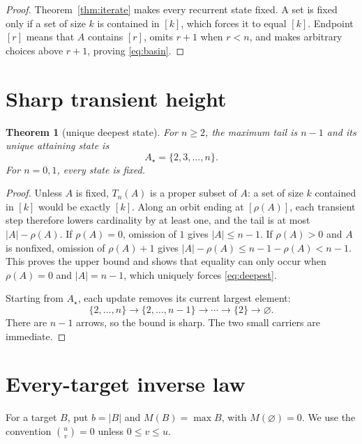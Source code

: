 \documentclass[a4paper,11pt]{amsart}
\newtheorem{theorem}{Theorem}[section]
\theoremstyle{remark}
\begin{document}
\begin{proof}
Theorem~\ref{thm:iterate} makes every recurrent state fixed.  A set is fixed
only if a set of size $k$ is contained in $[k]$, which forces it to equal
$[k]$.  Endpoint $[r]$ means that $A$ contains $[r]$, omits $r+1$ when
$r<n$, and makes arbitrary choices above $r+1$, proving
\eqref{eq:basin}.
\end{proof}

\section{Sharp transient height}

\begin{theorem}[unique deepest state]\label{thm:height}
For $n\geq2$, the maximum tail is $n-1$ and its unique attaining state is
\begin{equation}\label{eq:deepest}
 A_\star=\{2,3,\ldots,n\}.
\end{equation}
For $n=0,1$, every state is fixed.
\end{theorem}

\begin{proof}
Unless $A$ is fixed, $T_n(A)$ is a proper subset of $A$: a set of size $k$
contained in $[k]$ would be exactly $[k]$.  Along an orbit ending at
$[\rho(A)]$, each transient step therefore lowers cardinality by at least
one, and the tail is at most $|A|-\rho(A)$.  If $\rho(A)=0$, omission of
$1$ gives $|A|\leq n-1$.  If $\rho(A)>0$ and $A$ is nonfixed, omission of
$\rho(A)+1$ gives $|A|-\rho(A)\leq n-1-\rho(A)<n-1$.  This proves the upper
bound and shows that equality can only occur when $\rho(A)=0$ and
$|A|=n-1$, which uniquely forces \eqref{eq:deepest}.

Starting from $A_\star$, each update removes its current largest element:
\[
 \{2,\ldots,n\}\to\{2,\ldots,n-1\}\to\cdots\to\{2\}\to\varnothing.
\]
There are $n-1$ arrows, so the bound is sharp.  The two small carriers are
immediate.
\end{proof}

\section{Every-target inverse law}

For a target $B$, put $b=|B|$ and $M(B)=\max B$, with $M(\varnothing)=0$.
We use the convention $\binom uv=0$ unless $0\leq v\leq u$.
\end{document}

